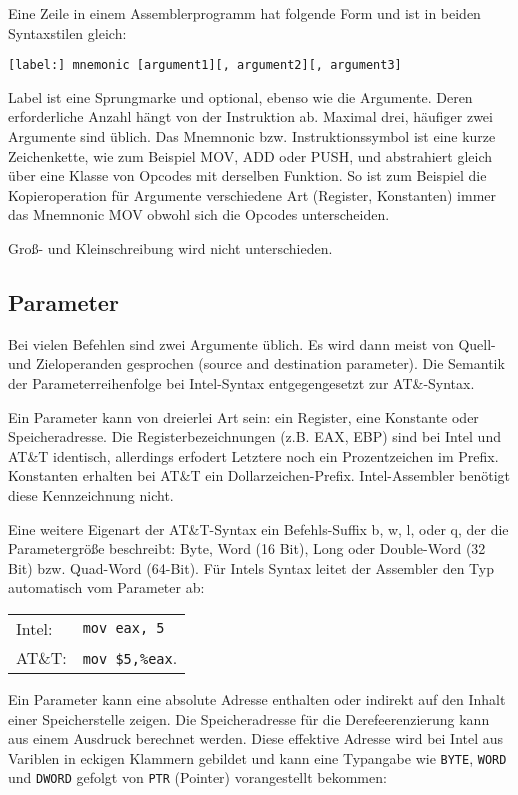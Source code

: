 Eine Zeile in einem Assemblerprogramm hat folgende Form und ist in beiden
Syntaxstilen gleich:

\texttt{[label:] mnemonic [argument1][, argument2][, argument3]}

Label ist eine Sprungmarke und optional, ebenso wie die Argumente. Deren
erforderliche Anzahl hängt von der Instruktion ab. Maximal drei, häufiger zwei
Argumente sind üblich. Das Mnemnonic bzw. Instruktionssymbol ist eine kurze
Zeichenkette, wie zum Beispiel MOV, ADD oder PUSH, und abstrahiert gleich über
eine Klasse von Opcodes mit derselben Funktion. So ist zum Beispiel die
Kopieroperation für Argumente verschiedene Art (Register, Konstanten) immer das
Mnemnonic MOV obwohl sich die Opcodes unterscheiden.

Groß- und Kleinschreibung wird nicht unterschieden.

\subsection{Parameter}

Bei vielen Befehlen sind zwei Argumente üblich. Es wird dann meist von Quell-
und Zieloperanden gesprochen (source and destination parameter). Die Semantik der
Parameterreihenfolge bei Intel-Syntax entgegengesetzt zur AT\&-Syntax.

Ein Parameter kann von dreierlei Art sein: ein Register, eine Konstante oder
Speicheradresse. Die Registerbezeichnungen (z.B. EAX, EBP) sind bei Intel und
AT\&T identisch, allerdings erfodert Letztere noch ein Prozentzeichen im
Prefix. Konstanten erhalten bei AT\&T ein Dollarzeichen-Prefix. Intel-Assembler
benötigt diese Kennzeichnung nicht.

Eine weitere Eigenart der AT\&T-Syntax ein Befehls-Suffix b, w, l, oder q, der die
Parametergröße beschreibt: Byte, Word (16 Bit), Long oder Double-Word  (32 Bit) bzw.
Quad-Word (64-Bit). Für Intels Syntax leitet der Assembler den Typ automatisch
vom Parameter ab:

\begin{tabular}{ll}
Intel: & \texttt{mov eax, 5} \\
AT\&T: & \texttt{mov \$5,\%eax}.
\end{tabular}

Ein Parameter kann eine absolute Adresse enthalten oder indirekt auf den Inhalt einer Speicherstelle zeigen. Die Speicheradresse für die Derefeerenzierung kann aus einem Ausdruck berechnet werden.
Diese effektive Adresse wird bei Intel aus Variblen in eckigen Klammern gebildet und kann eine
Typangabe wie \texttt{BYTE},  \texttt{WORD} und \texttt{DWORD} gefolgt von  \texttt{PTR} (Pointer) vorangestellt bekommen:

